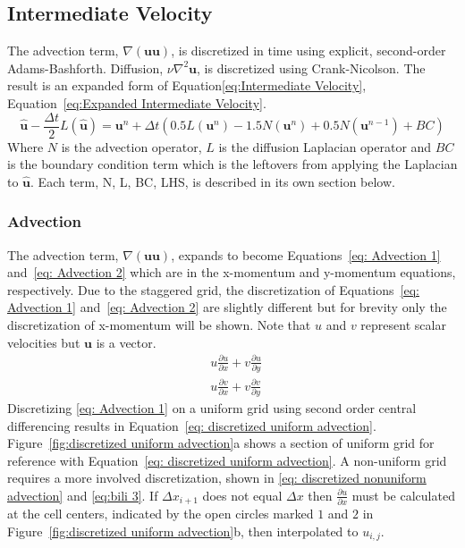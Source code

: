 \documentclass[onehalf,11pt]{beavtex}
\begin{document}
\subsection{Intermediate Velocity}
\label{sec:ID NS intermediate velocity}

The advection term, $\nabla (\textbf{uu})$, is discretized in time using explicit, second-order Adams-Bashforth. 
Diffusion, $\nu \nabla^2 \textbf{u}$, is discretized using Crank-Nicolson. 
The result is an expanded form of Equation\eqref{eq:Intermediate Velocity}, Equation~\eqref{eq:Expanded Intermediate Velocity}. 
\begin{equation}
\label{eq:Expanded Intermediate Velocity}
\hat{\textbf{u}} - \frac{\Delta t}{2}L(\hat{\textbf{u}}) = \textbf{u}^n + \Delta t\left(0.5L(\textbf{u}^n) - 1.5N(\textbf{u}^n) + 0.5N(\textbf{u}^{n-1}) + BC\right)
\end{equation}
Where $N$ is the advection operator, $L$ is the diffusion Laplacian operator and $BC$ is the boundary condition term which is the leftovers from applying the Laplacian to $\hat{\textbf{u}}$. 
Each term, N, L, BC, LHS, is described in its own section below. 

\subsubsection{Advection}
\label{sed:ID NS Advection}
The advection term, $\nabla (\textbf{uu})$, expands to become Equations~\eqref{eq: Advection 1} and~\eqref{eq: Advection 2} which are in the x-momentum and y-momentum equations, respectively. 
Due to the staggered grid, the discretization of Equations~\eqref{eq: Advection 1} and~\eqref{eq: Advection 2} are slightly different but for brevity only the discretization of x-momentum will be shown. 
Note that $u$ and $v$ represent scalar velocities but $\textbf{u}$ is a vector. 
\begin{align}
&u\frac{\partial u}{\partial x} + v\frac{\partial u}{\partial y} \label{eq: Advection 1} \\ 
&u\frac{\partial v}{\partial x} + v\frac{\partial v}{\partial y} \; \label{eq: Advection 2}
\end{align}
Discretizing \eqref{eq: Advection 1} on a uniform grid using second order central differencing results in Equation~\eqref{eq: discretized uniform advection}. 
Figure~\ref{fig:discretized uniform advection}a shows a section of uniform grid for reference with Equation~\eqref{eq: discretized uniform advection}. 
A non-uniform grid requires a more involved discretization, shown in \eqref{eq: discretized nonuniform advection} and \eqref{eq:bili 3}. 
If $\Delta x_{i+1}$ does not equal $\Delta x$ then $\frac{\partial u}{\partial x}$ must be calculated at the cell centers, indicated by the open circles marked $1$ and $2$ in Figure~\ref{fig:discretized uniform advection}b, then interpolated to $u_{i,j}$. 
\end{document}
